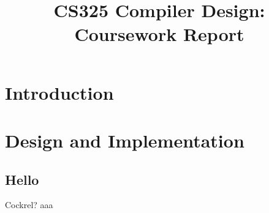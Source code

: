 \documentclass[11pt]{article}
\title{\vspace{-1.7cm}\TitleFont CS325 Compiler Design: Coursework Report}
\date{\vspace{-2.0cm}}
\begin{document}
\maketitle
\section*{Introduction}
\thispagestyle{fancy}

\section*{Design and Implementation}
\subsection*{Hello}
Cockrel?
\newpage
aaa
\end{document}
